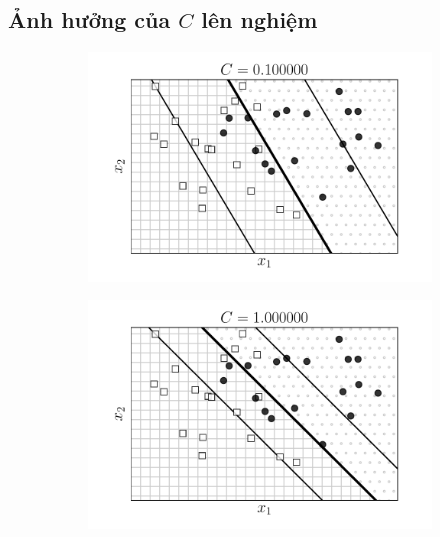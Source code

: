 

\subsection{Ảnh hưởng của $C$ lên nghiệm }

\begin{figure}[t]
\begin{subfigure}{0.45\textwidth}
\includegraphics[width=0.95\linewidth]{ebookML_src/src/softmargin_svm/ssvm5_01.pdf}
\end{subfigure}
\begin{subfigure}{0.45\textwidth}
\includegraphics[width=0.95\linewidth]{ebookML_src/src/softmargin_svm/ssvm5_1.pdf}
\end{subfigure}


\end{figure}
